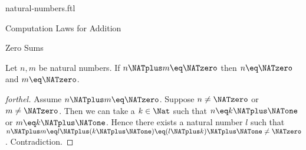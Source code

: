 \documentclass{naproche-library}
\begin{document}
\begin{smodule}[title=Natural Numbers]{natural-numbers.ftl}
\begin{sfragment}{Computation Laws for Addition}
  \begin{sfragment}{Zero Sums}
    \begin{proposition}[forthel,id=ARITHMETIC_03_3520602170195968]
      Let $n, m$ be natural numbers.
      If $n \NATplus m \eq \NATzero$ then $n \eq \NATzero$ and $m \eq \NATzero$.
    \end{proposition}
    \begin{proof}[forthel]
      Assume $n \NATplus m \eq \NATzero$.
      Suppose $n \neq \NATzero$ or $m \neq \NATzero$.
      Then we can take a $k \in \Nat$ such that $n \eq k \NATplus \NATone$ or $m \eq k \NATplus \NATone$.
      Hence there exists a natural number $l$ such that
      $n \NATplus m
        \eq l \NATplus (k \NATplus \NATone)
        \eq (l \NATplus k) \NATplus \NATone
        \neq \NATzero$.
      Contradiction.
    \end{proof}
  \end{sfragment}
\end{sfragment}
\end{smodule}
\end{document}
